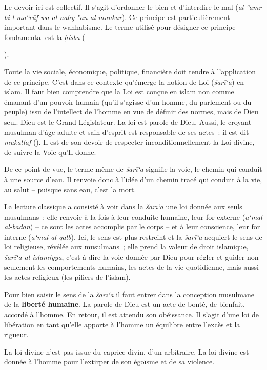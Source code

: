 \begin{Def}[ḥisba]
Le devoir ici est collectif. Il s'agit d'ordonner le bien et d'interdire
le mal (\emph{al ʿamr bi-l maʿrūf wa al-nahy ʿan al munkar}). Ce
principe est particulièrement important dans le wahhabisme. Le terme
utilisé pour désigner ce principe fondamental est la \emph{ḥisba}
(

). 
\end{Def}
Toute la vie sociale, économique, politique, financière
doit tendre à l'application de ce principe. C'est dans ce contexte
qu'émerge la notion de Loi (\emph{šarī`a}) en islam. Il faut bien
comprendre que la Loi est conçue en islam non comme émanant d'un pouvoir
humain (qu'il s'agisse d'un homme, du parlement ou du peuple) issu de
l'intellect de l'homme en vue de définir des normes, mais de Dieu seul.
Dieu est le Grand Législateur. La loi est parole de Dieu. Aussi, le
croyant musulman d'âge adulte et sain d'esprit est responsable de ses
actes~: il est dit \emph{mukallaf} (). Il est de son devoir
de respecter inconditionnellement la Loi divine, de suivre la Voie qu'Il
donne.

De ce point de vue, le terme même de \emph{šarī`a} signifie la voie, le
chemin qui conduit à une source d'eau. Il renvoie donc à l'idée d'un
chemin tracé qui conduit à la vie, au salut -- puisque sans eau, c'est
la mort.

La lecture classique a consisté à voir dans la \emph{šarī`a} une loi
donnée aux seuls musulmans~: elle renvoie à la fois à leur conduite
humaine, leur for externe (\emph{a`mal al-badan}) -- ce sont les actes
accomplis par le corps -- et à leur conscience, leur for interne
(\emph{a`mal al-qalb}). Ici, le sens est plus restreint et la
\emph{šarī`a} acquiert le sens de loi religieuse, révélée aux
musulmans~; elle prend la valeur de droit islamique, \emph{šarī`a
al-islamiyya}, c'est-à-dire la voie donnée par Dieu pour régler et
guider non seulement les comportements humains, les actes de la vie
quotidienne, mais aussi les actes religieux (les piliers de l'islam).

Pour bien saisir le sens de la \emph{šarī`a} il faut entrer dans la
conception musulmane de la \textbf{liberté humaine}. La parole de Dieu est un
acte de bonté, de bienfait, accordé à l'homme. En retour, il est attendu
son obéissance. Il s'agit d'une loi de libération en tant qu'elle
apporte à l'homme un équilibre entre l'excès et la rigueur. 
\begin{Def}[Loi]
La loi
divine n'est pas issue du caprice divin, d'un arbitraire. La loi divine
est donnée à l'homme pour l'extirper de son égoïsme et de sa violence.
\end{Def}


